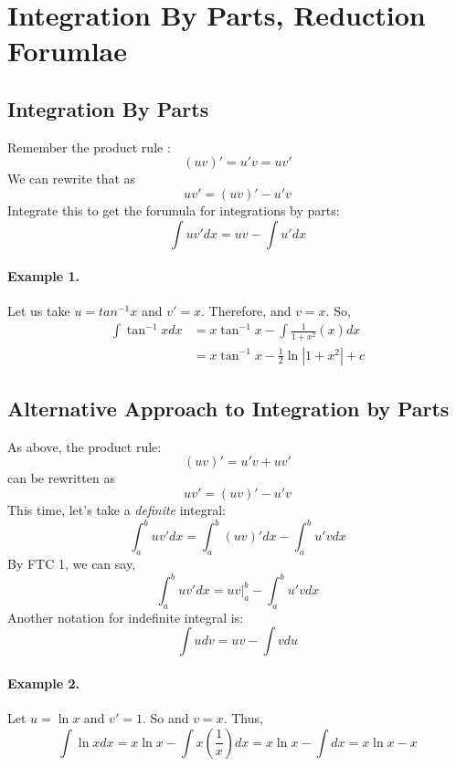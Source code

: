 

\chapter{Integration By Parts, Reduction Forumlae}
\bigbreak

\section{Integration By Parts}

Remember the product rule : $$(uv)' = u'v = uv'$$
We can rewrite that as $$uv' = (uv)' - u'v$$
Integrate this to get the forumula for integrations by parts:
$$ \int uv' dx = uv - \int u' dx $$

\subsubsection{Example 1.  }

Let us take $u = tan^{-1}x$ and $v' = x$.
Therefore,  and $v = x$.
So,
\begin{align*}
\int \tan^{-1} x dx & = x \tan^{-1} x - \int \frac{1}{1+x^2} (x) dx \\
	& = x \tan^{-1} x - \frac{1}{2} \ln |1+x^2| + c
\end{align*}


\section{Alternative Approach to Integration by Parts}

As above, the product rule: $$(uv)' = u'v + uv'$$
can be rewritten as $$uv' = (uv)' - u'v$$
This time, let's take a {\it definite} integral:
$$ \int_a^b uv' dx = \int_a^b (uv)' dx - \int_a^b u'v dx $$
By FTC 1, we can say,
$$ \int_a^b uv' dx = uv \Big|_a^b - \int_a^b u'v dx $$
Another notation for indefinite integral is:
$$ \int u dv = uv - \int v du $$

\subsubsection{Example 2. }
Let $u = \ln x$ and $v' = 1$. So  and $v = x$.
Thus,
$$ \int \ln x dx = x \ln x - \int x \left( \frac{1}{x} \right) dx = x \ln x - \int dx = x \ln x - x$$

